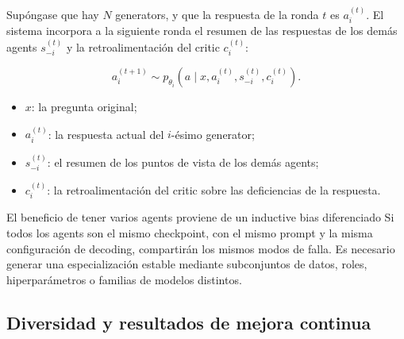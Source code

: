 


Supóngase que hay $N$ generators, y que la respuesta de la ronda $t$ es $a_i^{(t)}$. El sistema incorpora a la siguiente ronda el resumen de las respuestas de los demás agents $s_{-i}^{(t)}$ y la retroalimentación del critic $c_i^{(t)}$:

$$
a_i^{(t+1)}\sim p_{\theta_i}
\left(a\mid x,a_i^{(t)},s_{-i}^{(t)},c_i^{(t)}\right).
$$

\begin{itemize}
    \item $x$: la pregunta original;
    \item $a_i^{(t)}$: la respuesta actual del $i$-ésimo generator;
    \item $s_{-i}^{(t)}$: el resumen de los puntos de vista de los demás agents;
    \item $c_i^{(t)}$: la retroalimentación del critic sobre las deficiencias de la respuesta.
\end{itemize}


\begin{importantbox}{El beneficio de tener varios agents proviene de un inductive bias diferenciado}
Si todos los agents son el mismo checkpoint, con el mismo prompt y la misma configuración de decoding, compartirán los mismos modos de falla. Es necesario generar una especialización estable mediante subconjuntos de datos, roles, hiperparámetros o familias de modelos distintos.
\end{importantbox}

\subsection{Diversidad y resultados de mejora continua}

